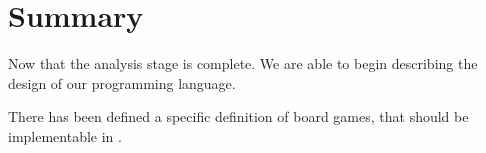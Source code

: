 \section{Summary}
Now that the analysis stage is complete. We are able to begin describing the design of our programming language.

There has been defined a specific definition of board games, that should be implementable in {\productname}.
